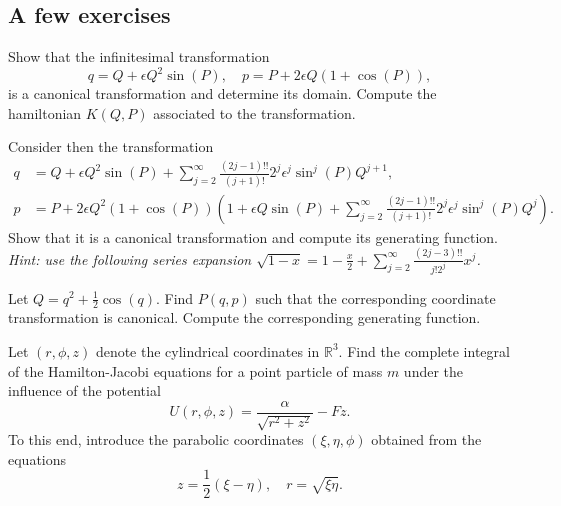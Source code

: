 \documentclass[english,fontsize=11pt,paper=a5,oneside]{scrbook}
\newcommand{\R}{\mathbb{R}}
\theoremstyle{definition}
\newenvironment{exercise}
  {\pushQED{\qed}\renewcommand{\qedsymbol}{$\maltese$}\exercisex}
  {\popQED\endexercisex}
\begin{document}
\subsection{A few exercises}
\begin{exercise}
    Show that the infinitesimal transformation
    \begin{equation}
        q = Q + \epsilon Q^2 \sin(P), \quad
        p = P + 2\epsilon Q(1+\cos(P)),
    \end{equation}
    is a canonical transformation and determine its domain.
    Compute the hamiltonian $K(Q,P)$ associated to the transformation.

    Consider then the transformation
    \begin{align}
        q &= Q + \epsilon Q^2 \sin(P) + \sum_{j=2}^\infty \frac{(2j-1)!!}{(j+1)!}2^j \epsilon^j \sin^j(P) Q^{j+1}, \\
        p &= P + 2\epsilon Q^2\left(1+\cos(P)\right)\left(
            1 + \epsilon Q \sin(P) + \sum_{j=2}^\infty \frac{(2j-1)!!}{(j+1)!}2^j \epsilon^j \sin^j(P) Q^{j}
            \right).
    \end{align}
    Show that it is a canonical transformation and compute its generating function.\\
    \textit{Hint: use the following series expansion $\sqrt{1-x} = 1 - \frac{x}{2} + \sum_{j=2}^\infty \frac{(2j-3)!!}{j! 2^j} x^j$.}
\end{exercise}

\begin{exercise}
    Let $Q = q^2 + \frac12 \cos(q)$.
    Find $P(q,p)$ such that the corresponding coordinate transformation is canonical.
    Compute the corresponding generating function.
\end{exercise}

\begin{exercise}[Parabolic coordinates]
    Let $(r,\phi,z)$ denote the cylindrical coordinates in $\R^3$.
    Find the complete integral of the Hamilton-Jacobi equations for a point particle of mass $m$ under the influence of the potential
    \begin{equation}
        U(r,\phi,z) = \frac{\alpha}{\sqrt{r^2+z^2}} - F z.
    \end{equation}
    To this end, introduce the parabolic coordinates $(\xi, \eta, \phi)$ obtained from the equations
    \begin{equation}
        z = \frac 12(\xi - \eta), \quad
        r = \sqrt{\xi\eta}.
    \end{equation}
\end{exercise}
\end{document}
